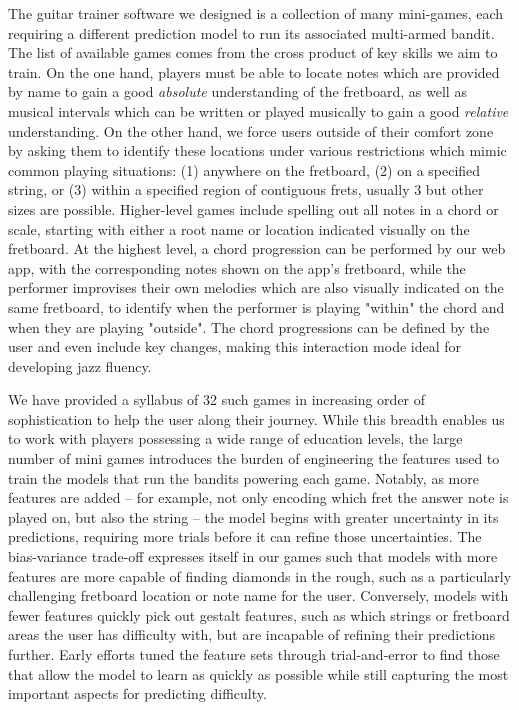 \documentclass[manuscript, nonacm]{acmart_no_footer}
\begin{document}
The guitar trainer software we designed is a collection of many mini-games, each requiring a different prediction model to run its associated multi-armed bandit. The list of available games comes from the cross product of key skills we aim to train. On the one hand, players must be able to locate notes which are provided by name to gain a good \textit{absolute} understanding of the fretboard, as well as musical intervals which can be written or played musically to gain a good \textit{relative} understanding. On the other hand, we force users outside of their comfort zone by asking them to identify these locations under various restrictions which mimic common playing situations: (1) anywhere on the fretboard, (2) on a specified string, or (3) within a specified region of contiguous frets, usually 3 but other sizes are possible. Higher-level games include spelling out all notes in a chord or scale, starting with either a root name or location indicated visually on the fretboard. At the highest level, a chord progression can be performed by our web app, with the corresponding notes shown on the app's fretboard, while the performer improvises their own melodies which are also visually indicated on the same fretboard, to identify when the performer is playing "within" the chord and when they are playing "outside". The chord progressions can be defined by the user and even include key changes, making this interaction mode ideal for developing jazz fluency.

We have provided a syllabus of 32 such games in increasing order of sophistication to help the user along their journey.  While this breadth enables us to work with players possessing a wide range of education levels, the large number of mini games introduces the burden of engineering the features used to train the models that run the bandits powering each game. Notably, as more features are added -- for example, not only encoding which fret the answer note is played on, but also the string -- the model begins with greater uncertainty in its predictions, requiring more trials before it can refine those uncertainties. The bias-variance trade-off expresses itself in our games such that models with more features are more capable of finding diamonds in the rough, such as a particularly challenging fretboard location or note name for the user. Conversely, models with fewer features quickly pick out gestalt features, such as which strings or fretboard areas the user has difficulty with, but are incapable of refining their predictions further. Early efforts tuned the feature sets through trial-and-error to find those that allow the model to learn as quickly as possible while still capturing the most important aspects for predicting difficulty. 
\end{document}
